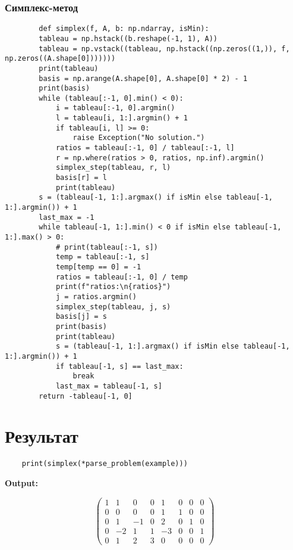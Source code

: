 \documentclass{article}
\begin{document}
\subsubsection{Симплекс-метод}
\begin{listing}[H]
    \begin{verbatim}
        def simplex(f, A, b: np.ndarray, isMin):
        tableau = np.hstack((b.reshape(-1, 1), A))
        tableau = np.vstack((tableau, np.hstack((np.zeros((1,)), f, np.zeros((A.shape[0]))))))
        print(tableau)
        basis = np.arange(A.shape[0], A.shape[0] * 2) - 1
        print(basis)
        while (tableau[:-1, 0].min() < 0):
            i = tableau[:-1, 0].argmin()
            l = tableau[i, 1:].argmin() + 1
            if tableau[i, l] >= 0:
                raise Exception("No solution.")
            ratios = tableau[:-1, 0] / tableau[:-1, l]
            r = np.where(ratios > 0, ratios, np.inf).argmin()
            simplex_step(tableau, r, l)
            basis[r] = l
            print(tableau)
        s = (tableau[-1, 1:].argmax() if isMin else tableau[-1, 1:].argmin()) + 1
        last_max = -1
        while tableau[-1, 1:].min() < 0 if isMin else tableau[-1, 1:].max() > 0:
            # print(tableau[:-1, s])
            temp = tableau[:-1, s]
            temp[temp == 0] = -1
            ratios = tableau[:-1, 0] / temp
            print(f"ratios:\n{ratios}")
            j = ratios.argmin()
            simplex_step(tableau, j, s)
            basis[j] = s
            print(basis)
            print(tableau)
            s = (tableau[-1, 1:].argmax() if isMin else tableau[-1, 1:].argmin()) + 1
            if tableau[-1, s] == last_max:
                break
            last_max = tableau[-1, s]
        return -tableau[-1, 0]

    \end{verbatim}
\end{listing}

\section{Результат}
\begin{listing}[H]
    \begin{verbatim}
    print(simplex(*parse_problem(example)))
    \end{verbatim}
\end{listing}

\textbf{Output:}

$$\begin{pmatrix}
1& 1& 0& 0& 1& 0& 0& 0\\
0& 0& 0& 0& 1& 1& 0& 0\\
0& 1&-1& 0& 2& 0& 1& 0\\
0&-2& 1& 1&-3& 0& 0& 1\\
0& 1& 2& 3& 0& 0& 0& 0
\end{pmatrix}$$
\end{document}
